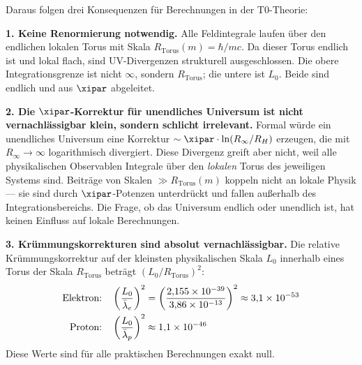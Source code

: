Daraus folgen drei Konsequenzen für Berechnungen in der T0-Theorie:

\textbf{1. Keine Renormierung notwendig.} Alle Feldintegrale laufen über den endlichen lokalen Torus mit Skala $R_\text{Torus}(m) = \hbar/mc$. Da dieser Torus endlich ist und lokal flach, sind UV-Divergenzen strukturell ausgeschlossen. Die obere Integrationsgrenze ist nicht $\infty$, sondern $R_\text{Torus}$; die untere ist $L_0$. Beide sind endlich und aus $\xipar$ abgeleitet.

\textbf{2. Die $\xipar$-Korrektur für unendliches Universum ist nicht vernachlässigbar klein, sondern schlicht irrelevant.} Formal würde ein unendliches Universum eine Korrektur $\sim \xipar \cdot \ln(R_\infty / R_H)$ erzeugen, die mit $R_\infty \to \infty$ logarithmisch divergiert. Diese Divergenz greift aber nicht, weil alle physikalischen Observablen Integrale über den \emph{lokalen} Torus des jeweiligen Systems sind. Beiträge von Skalen $\gg R_\text{Torus}(m)$ koppeln nicht an lokale Physik — sie sind durch $\xipar$-Potenzen unterdrückt und fallen außerhalb des Integrationsbereichs. Die Frage, ob das Universum endlich oder unendlich ist, hat keinen Einfluss auf lokale Berechnungen.

\textbf{3. Krümmungskorrekturen sind absolut vernachlässigbar.} Die relative Krümmungskorrektur auf der kleinsten physikalischen Skala $L_0$ innerhalb eines Torus der Skala $R_\text{Torus}$ beträgt $(L_0 / R_\text{Torus})^2$:
\begin{align}
	\text{Elektron:} \quad & \left(\frac{L_0}{\bar\lambda_e}\right)^2 = \left(\frac{2{,}155\times 10^{-39}}{3{,}86\times 10^{-13}}\right)^2 \approx 3{,}1 \times 10^{-53} \notag \\
	\text{Proton:} \quad & \left(\frac{L_0}{\bar\lambda_p}\right)^2 \approx 1{,}1 \times 10^{-46} \notag
\end{align}
Diese Werte sind für alle praktischen Berechnungen exakt null.

